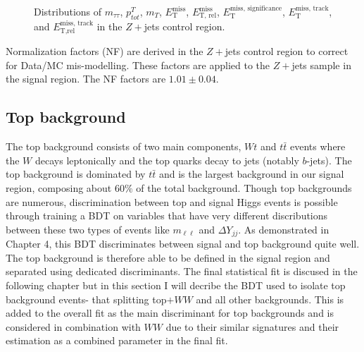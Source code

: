 \begin{figure}[!h]
{  }\hfill
  \hfill
{\caption{Distributions of $m_{\tau\tau}$, $p^T_{tot}$, $m_T$, $\ensuremath{E_{\text{T}}^{\text{miss}}}$, $\ensuremath{E_{\text{T, rel}}^{\text{miss}}}$, $\ensuremath{E_{\text{T}}^{\text{miss, significance}}}$, $\ensuremath{E_{\text{T}}^{\text{miss, track}}}$, and $\ensuremath{E_{\text{T,rel}}^{\text{miss, track}}}$ in the $Z+$jets control region.
\label{fig:DYCR3}}}
\end{figure}

Normalization factors (NF) are derived in the $Z+$jets control region to correct for Data/MC mis-modelling. These factors are applied to the $Z+$jets sample in the signal region. The NF factors are $1.01 \pm 0.04$. 

\subsection{Top background}
The top background consists of two main components, $Wt$ and $t\bar{t}$ events where the $W$ decays leptonically and the top quarks decay to jets (notably $b$-jets). The top background is dominated by $t\bar{t}$ and is the largest background in our signal region, composing about $60\%$ of the total background. Though top backgrounds are numerous, discrimination between top and signal Higgs events is possible through training a BDT on variables that have very different discributions between these two types of events like $m_{\ell\ell}$ and $\Delta Y_{jj}$. As demonstrated in Chapter 4, this BDT discriminates between signal and top background quite well. The top background is therefore able to be defined in the signal region and separated using dedicated discriminants. The final statistical fit is discused in the following chapter but in this section I will decribe the BDT used to isolate top background events- that splitting top$+WW$ and all other backgrounds. This is added to the overall fit as the main discriminant for top backgrounds and is considered in combination with $WW$ due to their similar signatures and their estimation as a combined parameter in the final fit.  

